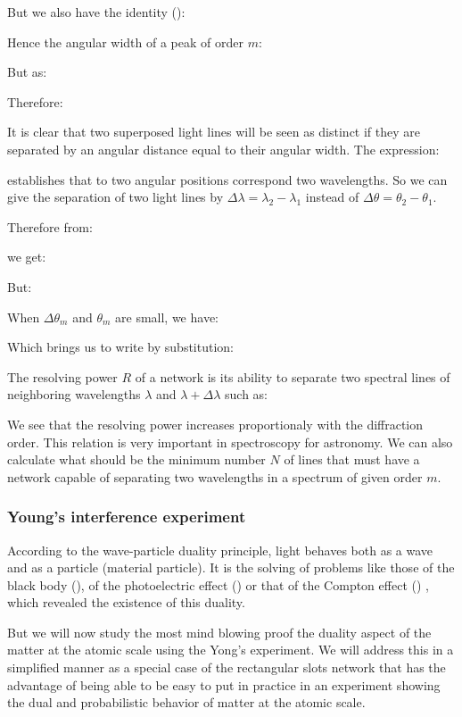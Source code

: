 	But we also have the identity ():
	
	Hence the angular width of a peak of order $m$:
	
	But as:
	
	Therefore:
	
	It is clear that two superposed light lines will be seen as distinct if they are separated by an angular distance equal to their angular width. The expression:
	
	establishes that to two angular positions correspond two wavelengths. So we can give the separation of two light lines by $\Delta \lambda=\lambda_2-\lambda_1$ instead of $\Delta\theta=\theta_2-\theta_1$.
	
	Therefore from:
	
	we get:
	
	But:
	
	When $\Delta \theta_m$ and $\theta_m$ are small, we have:
	
	Which brings us to write by substitution:
	
	The resolving power $R$ of a network is its ability to separate two spectral lines of neighboring wavelengths $\lambda$ and $\lambda+\Delta\lambda$ such as:
	
	We see that the resolving power increases proportionaly with the diffraction order. This relation is very important in spectroscopy for astronomy. We can also calculate what should be the minimum number $N$ of lines that must have a network capable of separating two wavelengths in a spectrum of given order $m$.
	
	\subsubsection{Young's interference experiment}
	According to the wave-particle duality principle, light behaves both as a wave and as a particle (material particle). It is the solving of problems like those of the black body (), of the photoelectric effect () or that of the Compton effect () , which revealed the existence of this duality.

	But we will now study the most mind blowing proof the duality aspect of the matter at the atomic scale using the Yong's experiment. We will address this in a simplified manner as a special case of the rectangular slots network that has the advantage of being able to be easy to put in practice in an experiment showing the dual and probabilistic behavior of matter at the atomic scale.

